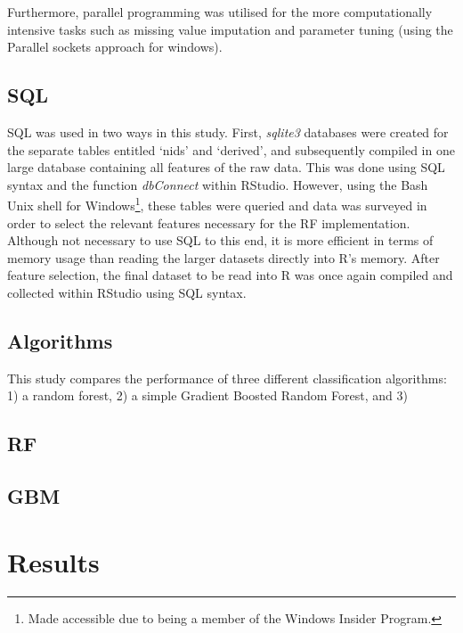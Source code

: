 \documentclass[11pt,preprint, authoryear]{elsarticle}
\numberwithin{equation}{section}
\numberwithin{figure}{section}
\numberwithin{table}{section}
\let\rmarkdownfootnote\footnote%
\def\footnote{\protect\rmarkdownfootnote}
\begin{document}
Furthermore, parallel programming was utilised for the more
computationally intensive tasks such as missing value imputation and
parameter tuning (using the Parallel sockets approach for windows).

\hypertarget{sql}{%
\subsection*{SQL}\label{sql}}

SQL was used in two ways in this study. First, \emph{sqlite3} databases
were created for the separate tables entitled `nids' and `derived', and
subsequently compiled in one large database containing all features of
the raw data. This was done using SQL syntax and the function
\emph{dbConnect} within RStudio. However, using the Bash Unix shell for
Windows\footnote{Made accessible due to being a member of the Windows
  Insider Program.}, these tables were queried and data was surveyed in
order to select the relevant features necessary for the RF
implementation. Although not necessary to use SQL to this end, it is
more efficient in terms of memory usage than reading the larger datasets
directly into R's memory. After feature selection, the final dataset to
be read into R was once again compiled and collected within RStudio
using SQL syntax.

\hypertarget{algorithms}{%
\subsection*{Algorithms}\label{algorithms}}

This study compares the performance of three different classification
algorithms: 1) a random forest, 2) a simple Gradient Boosted Random
Forest, and 3)

\hypertarget{rf}{%
\subsection*{RF}\label{rf}}

\hypertarget{gbm}{%
\subsection*{GBM}\label{gbm}}

\hypertarget{results}{%
\section{Results}\label{results}}
\end{document}
